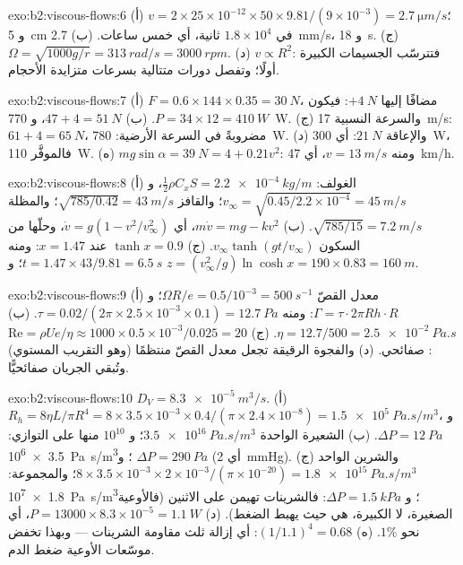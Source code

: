 \begin{solution}{exo:b2:viscous-flows:6}
(أ) $v = 2 \times 25 \times 10^{-12} \times 50 \times 9.81/(9 \times 10^{-3}) = \qty{2.7}{\micro m/s}$؛
و \qty{5}{cm} في $1.8 \times 10^4$ ثانية، أي خمس ساعات. (ب) \qty{2.7}{mm/s}، و \qty{18}{s}. (ج)
$\Omega = \sqrt{1000g/r} = \qty{313}{rad/s} = \qty{3000}{rpm}$. (د) $v \propto R^2$: فتترسّب
الجسيمات الكبيرة أولًا؛ وتفصل دورات متتالية بسرعات متزايدة
الأحجام.
\end{solution}

\begin{solution}{exo:b2:viscous-flows:7}
(أ) $F = 0.6 \times 144 \times 0.35 = \qty{30}{N}$، مضافًا إليها $+\qty{4}{N}$: فيكون $P = 34 \times 12 =
\qty{410}{W}$. (ب) $47 + 4 = \qty{51}{N}$، و \qty{770}{W}. (ج) والسرعة النسبية
\qty{17}{m/s}: $61 + 4 = \qty{65}{N}$، مضروبةً في السرعة الأرضية: \qty{780}{W}. (د)
والإعاقة $\qty{21}{N}$: أي \qty{300}{W}، فالموفَّر \qty{110}{W}. (ه) $mg\sin\alpha = \qty{39}{N} =
4 + 0.21v^2$: ومنه $v = \qty{13}{m/s}$، أي \qty{47}{km/h}.
\end{solution}

\begin{solution}{exo:b2:viscous-flows:8}
(أ) الغولف: $\tfrac12\rho C_xS = \qty{2.2e-4}{kg/m}$، و $v_\infty = \sqrt{0.45/2.2 \times 10^{-4}}
= \qty{45}{m/s}$؛ والقافز $\sqrt{785/0.42} = \qty{43}{m/s}$؛ والمظلة $\sqrt{785/15} =
\qty{7.2}{m/s}$. (ب) $m\dot v = mg - kv^2$، أي $\dot v = g(1 - v^2/v_\infty^2)$،
وحلّها من السكون $v_\infty\tanh(gt/v_\infty)$. (ج) $\tanh x = 0.9$ عند
$x = 1.47$: ومنه $t = 1.47 \times 43/9.81 = \qty{6.5}{s}$؛ و $z = (v_\infty^2/g)\ln\cosh x =
190 \times 0.83 = \qty{160}{m}$.
\end{solution}

\begin{solution}{exo:b2:viscous-flows:9}
(أ) معدل القصّ $\Omega R/e = 0.5/10^{-3} = \qty{500}{s^{-1}}$؛ و $\Gamma = \tau\cdot2\pi Rh
\cdot R$: ومنه $\tau = 0.02/(2\pi \times 2.5 \times 10^{-3} \times 0.1) = \qty{12.7}{Pa}$. (ب) $\eta
= 12.7/500 = \qty{2.5e-2}{Pa.s}$. (ج) $\mathrm{Re} = \rho Ue/\eta \approx 1000 \times 0.5 \times
10^{-3}/0.025 = 20$: صفائحي. (د) والفجوة الرقيقة تجعل معدل القصّ منتظمًا
(وهو التقريب المستوي) وتُبقي الجريان صفائحيًّا.
\end{solution}

\begin{solution}{exo:b2:viscous-flows:10}
$D_V = \qty{8.3e-5}{m^3/s}$. (أ) $R_h = 8\eta L/\pi R^4 = 8 \times 3.5 \times 10^{-3} \times
0.4/(\pi \times 2.4 \times 10^{-8}) = \qty{1.5e5}{Pa.s/m^3}$، و $\Delta P = \qty{12}{Pa}$. (ب)
الشعيرة الواحدة $\qty{3.5e16}{Pa.s/m^3}$؛ و $10^{10}$ منها على التوازي: \qty{3.5e6}{Pa.s/m^3}؛
و $\Delta P = \qty{290}{Pa}$ (أي \qty{2}{mmHg}). (ج) والشرين الواحد $8 \times 3.5 \times 10^{-3}
\times 2 \times 10^{-3}/(\pi \times 10^{-20}) = \qty{1.8e15}{Pa.s/m^3}$؛ والمجموعة:
\qty{1.8e7}{Pa.s/m^3}؛ و $\Delta P = \qty{1.5}{kPa}$: فالشرينات تهيمن على
الاثنين (فالأوعية الصغيرة، لا الكبيرة، هي حيث يهبط
الضغط). (د) $P = 13000 \times 8.3 \times 10^{-5} = \qty{1.1}{W}$، أي نحو $1\%$. (ه)
$(1/1.1)^4 = 0.68$: أي إزالة ثلث مقاومة الشرينات ---
وبهذا تخفض موسّعات الأوعية ضغط الدم.
\end{solution}

